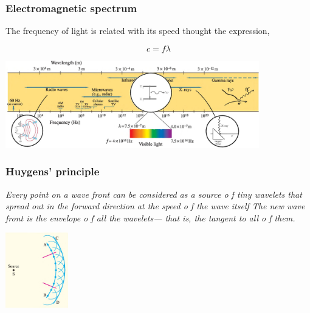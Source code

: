 \documentclass[]{beamer}
\begin{document}
\begin{frame}

\frametitle{Electromagnetic spectrum}

The frequency of light is related with its speed thought the expression,

\begin{equation*}
c=f\lambda
\end{equation*}

  \begin{center}
  \includegraphics[height=1.5in]{images5/spectrum5.jpg}
\end{center}



  \end{frame}









\begin{frame}

\frametitle{Huygens' principle}

\textit{Every point on a wave front can be considered as a source o f tiny
wavelets that spread out in the forward direction at the speed o f the wave itself
The new wave front is the envelope o f all the wavelets— that is, the tangent to all
o f them.}

  \begin{center}
  \includegraphics[height=1.3in]{images5/Huygen.jpg}
\end{center}



  \end{frame}
\end{document}
